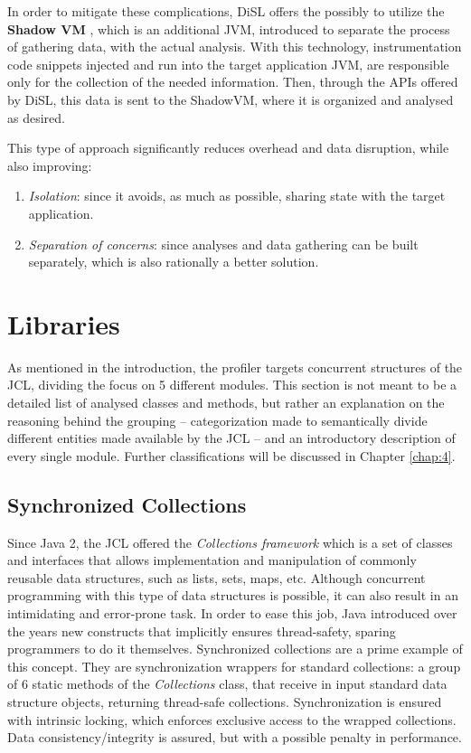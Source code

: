 \documentclass[]{usiinfthesis}
\begin{document}
In order to mitigate these complications, DiSL offers the possibly to utilize the \textbf{Shadow VM} \cite{ShadowVM}, which is an additional JVM, introduced to separate the process of gathering data, with the actual analysis. With this technology, instrumentation code snippets injected and run into the target application JVM, are responsible only for the collection of the needed information. Then, through the APIs offered by DiSL, this data is sent to the ShadowVM, where it is organized and analysed as desired. 

This type of approach significantly reduces overhead and data disruption, while also improving:
\begin{enumerate}
    \item \textit{Isolation}: since it avoids, as much as possible, sharing state with the target application. 
    \item \textit{Separation of concerns}: since analyses and data gathering can be built separately, which is also rationally a better solution.
\end{enumerate}

\section{Libraries} \label{sec:2.5}
As mentioned in the introduction, the profiler targets concurrent structures of the JCL, dividing the focus on 5 different modules. This section is not meant to be a detailed list of analysed classes and methods, but rather an explanation on the reasoning behind the grouping -- categorization made to semantically divide different entities made available by the JCL -- and an introductory description of every single module. Further classifications will be discussed in Chapter \ref{chap:4}.

\subsection{Synchronized Collections}
Since Java 2, the JCL offered the \textit{Collections framework} which is a set of classes and interfaces that allows implementation and manipulation of commonly reusable data structures, such as lists, sets, maps, etc. Although concurrent programming with this type of data structures is possible, it can also result in an intimidating and error-prone task. In order to ease this job, Java introduced over the years new constructs that implicitly ensures thread-safety, sparing programmers to do it themselves. Synchronized collections are a prime example of this concept. They are synchronization wrappers for standard collections: a group of 6 static methods of the \textit{Collections} class, that receive in input standard data structure objects, returning thread-safe collections. Synchronization is ensured with intrinsic locking, which enforces exclusive access to the wrapped collections. Data consistency/integrity is assured, but with a possible penalty in performance.
\end{document}
